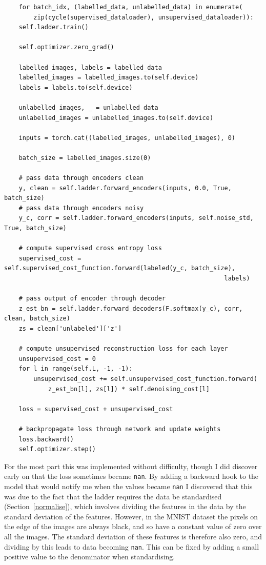 {\renewcommand{\baselinestretch}{0.8}\small
    \begin{verbatim}
    for batch_idx, (labelled_data, unlabelled_data) in enumerate(
        zip(cycle(supervised_dataloader), unsupervised_dataloader)):
    self.ladder.train()

    self.optimizer.zero_grad()

    labelled_images, labels = labelled_data
    labelled_images = labelled_images.to(self.device)
    labels = labels.to(self.device)

    unlabelled_images, _ = unlabelled_data
    unlabelled_images = unlabelled_images.to(self.device)

    inputs = torch.cat((labelled_images, unlabelled_images), 0)

    batch_size = labelled_images.size(0)
    
    # pass data through encoders clean
    y, clean = self.ladder.forward_encoders(inputs, 0.0, True, batch_size)
    # pass data through encoders noisy
    y_c, corr = self.ladder.forward_encoders(inputs, self.noise_std, True, batch_size)

    # compute supervised cross entropy loss
    supervised_cost = self.supervised_cost_function.forward(labeled(y_c, batch_size), 
                                                            labels)
    
    # pass output of encoder through decoder
    z_est_bn = self.ladder.forward_decoders(F.softmax(y_c), corr, clean, batch_size)
    zs = clean['unlabeled']['z']
    
    # compute unsupervised reconstruction loss for each layer
    unsupervised_cost = 0
    for l in range(self.L, -1, -1):
        unsupervised_cost += self.unsupervised_cost_function.forward(
            z_est_bn[l], zs[l]) * self.denoising_cost[l]
     
    loss = supervised_cost + unsupervised_cost
    
    # backpropagate loss through network and update weights
    loss.backward()
    self.optimizer.step()
    \end{verbatim}
}

For the most part this was implemented without difficulty, though I did discover early on that the loss sometimes became \texttt{nan}.
By adding a backward hook to the model that would notify me when the values became \texttt{nan} I discovered that this was due to the 
fact that the ladder requires the data be standardised (Section~\ref{normalise}), which involves dividing the features in the data by the standard deviation of the 
features. However, in the MNIST dataset the pixels on the edge of the images are always black, and so have a constant value of zero over 
all the images. The standard deviation of these features is therefore also zero, and dividing by this leads to data becoming \texttt{nan}.
This can be fixed by adding a small positive value to the denominator when standardising.

